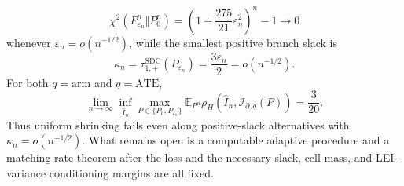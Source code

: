 \[
 \chi^2(P_{\varepsilon_n}^n\Vert P_0^n)
 =\left(1+\frac{275}{21}\varepsilon_n^2\right)^n-1\longrightarrow0
\]
whenever \(\varepsilon_n=o(n^{-1/2})\), while the smallest positive branch slack is
\[
 \kappa_n=\tau_{1,+}^{\mathrm{SDC}}(P_{\varepsilon_n})
 =\frac{3\varepsilon_n}{2}=o(n^{-1/2}).
\]
For both \(q=\mathrm{arm}\) and \(q=\mathrm{ATE}\),
\[
 \lim_{n\to\infty}\inf_{\widehat I_n}
 \max_{P\in\{P_0,P_{\varepsilon_n}\}}
 \mathbb E_{P^n}\rho_H\!\left(\widehat I_n,
 \mathcal I_{\partial,q}(P)\right)=\frac{3}{20}.
\]
Thus uniform shrinking fails even along positive-slack alternatives with \(\kappa_n=o(n^{-1/2})\).  What remains open is a computable adaptive procedure and a matching rate theorem after the loss and the necessary slack, cell-mass, and LEI-variance conditioning margins are all fixed.

